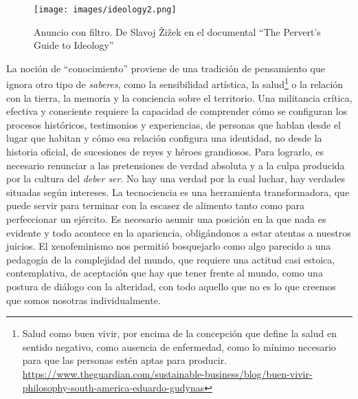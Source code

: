 \begin{figure}[htbp]
	\centering
	\texttt{[image: images/ideology2.png]}
	\caption[Anuncio con filtro.]{Anuncio con filtro. De Slavoj Žižek en el documental \enquote{The Pervert's Guide to Ideology}}
\end{figure}

La noción de \enquote{conocimiento} proviene de una tradición de pensamiento que ignora otro tipo de \emph{saberes}, como la sensibilidad artística, la salud\footnote{Salud como buen vivir, por encima de la concepción que define la salud en sentido negativo, como ausencia de enfermedad, como lo mínimo necesario para que las personas estén aptas para producir. \url{https://www.theguardian.com/sustainable-business/blog/buen-vivir-philosophy-south-america-eduardo-gudynas}} o la relación con la tierra, la memoria y la conciencia sobre el territorio. Una militancia crítica, efectiva y consciente requiere la capacidad de comprender cómo se configuran los procesos históricos, testimonios y experiencias, de personas que hablan desde el lugar que habitan y cómo esa relación configura una identidad, no desde la historia oficial, de sucesiones de reyes y héroes grandiosos. Para lograrlo, es necesario renunciar a las pretensiones de verdad absoluta y a la culpa producida por la cultura del \emph{deber ser}. No hay una verdad por la cual luchar, hay verdades situadas según intereses. La tecnociencia es una herramienta transformadora, que puede servir para terminar con la escasez de alimento tanto como para perfeccionar un ejército. Es necesario asumir una posición en la que nada es evidente y todo acontece en la apariencia, obligándonos a estar atentas a nuestros juicios. El xenofeminismo nos permitió bosquejarlo como algo parecido a una pedagogía de la complejidad del mundo, que requiere una actitud casi estoica, contemplativa, de aceptación que hay que tener frente al mundo, como una postura de diálogo con la alteridad, con todo aquello que no es lo que creemos que somos nosotras individualmente.

